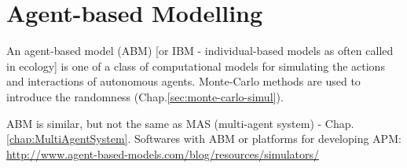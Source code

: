 \chapter{Agent-based Modelling}
\label{chap:Agent-based_Model}

An agent-based model (ABM) [or IBM - individual-based models as often called in
ecology] is one of a class of computational models for simulating the actions
and interactions of autonomous agents.
Monte-Carlo methods are used to introduce the randomness
(Chap.\ref{sec:monte-carlo-simul}).


ABM is similar, but not the same as MAS (multi-agent system) - Chap.\ref{chap:MultiAgentSystem}. 
Softwares with ABM or platforms for developing APM:
\url{http://www.agent-based-models.com/blog/resources/simulators/}

